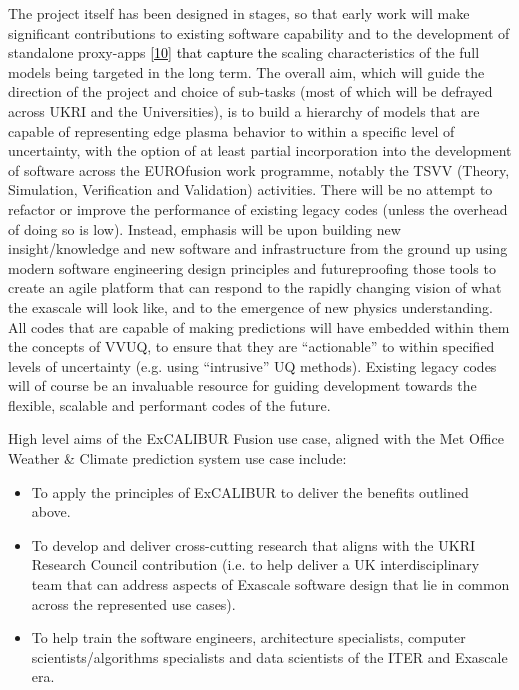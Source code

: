 \documentclass[a4paper]{article}
\newcommand\textstyleInternetlink[1]{\textcolor{blue}{#1}}
\newcommand\liststyleWWNumvii{%
\renewcommand\labelitemi{[F0B7?]}
\renewcommand\labelitemii{o}
\renewcommand\labelitemiii{[F0A7?]}
\renewcommand\labelitemiv{[F0B7?]}
}
\begin{document}
\bigskip

The project itself has been designed in stages, so that early work will make significant contributions to existing
software capability and to the development of standalone proxy-apps\textcolor{black}{
}\href{https://proxyapps.exascaleproject.org/app/}{\textstyleInternetlink{\textcolor{black}{[10]}}}\textcolor{black}{
that capture the }scaling characteristics of the full models being targeted in the long term. The overall aim, which
will guide the direction of the project and choice of sub-tasks (most of which will be defrayed across UKRI and the
Universities), is to build a hierarchy of models that are capable of representing edge plasma behavior to within a
specific level of uncertainty, with the option of at least partial incorporation into the development of software
across the EUROfusion work programme, notably the TSVV (Theory, Simulation, Verification and Validation) activities.
There will be no attempt to refactor or improve the performance of existing legacy codes (unless the overhead of doing
so is low). Instead, emphasis will be upon building new insight/knowledge and new software and infrastructure from the
ground up using modern software engineering design principles and futureproofing those tools to create an agile
platform that can respond to the rapidly changing vision of what the exascale will look like, and to the emergence of
new physics understanding. All codes that are capable of making predictions will have embedded within them the concepts
of VVUQ, to ensure that they are ``actionable'' to within specified levels of uncertainty (e.g. using ``intrusive'' UQ
methods). Existing legacy codes will of course be an invaluable resource for guiding development towards the flexible,
scalable and performant codes of the future.


\bigskip

High level aims of the ExCALIBUR Fusion use case, aligned with the Met Office Weather \& Climate prediction system use
case include:


\bigskip

\liststyleWWNumvii
\begin{itemize}
\item To apply the principles of ExCALIBUR to deliver the benefits outlined above.
\item To develop and deliver cross-cutting research that aligns with the UKRI Research Council contribution (i.e. to
help deliver a UK interdisciplinary team that can address aspects of Exascale software design that lie in common across
the represented use cases).
\item To help train the software engineers, architecture specialists, computer scientists/algorithms specialists and
data scientists of the ITER and Exascale era.
\end{itemize}
\end{document}
